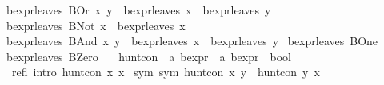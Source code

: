 \begin{isabellebody}
{}\ {}bexpr{}leaves\ {}BOr\ x\ y{}\ {}\ bexpr{}leaves\ x\ {}\ bexpr{}leaves\ y{}\isanewline
{}\ {}bexpr{}leaves\ {}BNot\ x{}\ {}\ bexpr{}leaves\ x{}\isanewline
{}\ {}bexpr{}leaves\ {}BAnd\ x\ y{}\ {}\ bexpr{}leaves\ x\ {}\ bexpr{}leaves\ y{}\isanewline
{}\ {}bexpr{}leaves\ BOne\ {}\ {}{}{}\isanewline
{}\ {}bexpr{}leaves\ BZero\ {}\ {}{}{}\isanewline
\isanewline
{}\isamarkupfalse%
\ hunt{}con\ {}{}\ {}{}a\ bexpr\ {}\ {}a\ bexpr\ {}\ bool{}\ \isanewline
\ \ refl\ {}intro{}{}\ {}hunt{}con\ x\ x{}\isanewline
{}\ sym\ {}sym{}{}\ {}hunt{}con\ x\ y\ {}\ hunt{}con\ y\ x{}\isanewline

\end{isabellebody}
